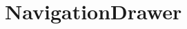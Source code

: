 \documentclass[FIPLY_base.tex]{subfiles}
\author{Andreas Denkmayr}
\date{21. Februar 2016}
\begin{document}
\section{NavigationDrawer}
\cite{navdrawer}
\end{document}
